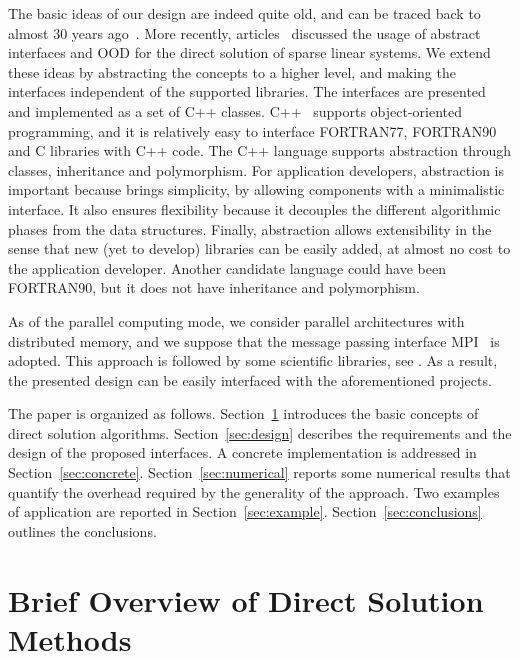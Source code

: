 \documentclass[acmtocl]{acmtrans2m}
\begin{document}
The basic ideas of our design are indeed quite old, and can be traced back to
almost 30 years ago~\cite{duff79performance,george79design}. More recently,
  articles~\cite{george99object,dobrian99design} discussed the usage of
  abstract interfaces and OOD for the direct solution of sparse linear
  systems.  We extend these ideas by abstracting the concepts to
a higher level, and making the interfaces independent of the supported
libraries. The interfaces are presented and implemented as a
set of C++ classes.  C++~\cite{cppbook}
supports object-oriented programming, and it is relatively easy to interface
FORTRAN77, FORTRAN90 and C libraries with C++ code. The C++ language
supports abstraction through classes, inheritance and polymorphism. For
application developers, abstraction is important because brings simplicity,
by allowing components with a minimalistic interface. It also ensures flexibility
because it decouples the different algorithmic phases from the data structures.
Finally, abstraction allows extensibility in the sense that new (yet to
                                                                develop)
libraries can be easily added, at almost no cost to the application developer.
Another candidate language could have been FORTRAN90, but it does not have
inheritance and polymorphism.

%
%
As of the parallel computing mode, 
we consider parallel architectures with distributed memory, and we suppose
that the message passing interface MPI~\cite{gropp98mpi} is adopted.
This approach is followed by some scientific libraries, see
\cite{heroux05trilinos,petsc-user-ref,falgout02hypre}. As a result, the presented
design can be easily interfaced with the aforementioned projects.

\smallskip

The paper is organized as follows. Section~\ref{sec:overview} introduces the
basic concepts of direct solution algorithms. Section~\ref{sec:design}
describes the requirements and the design of the proposed
interfaces. A concrete implementation is addressed in
Section~\ref{sec:concrete}. Section~\ref{sec:numerical} reports some
numerical results that quantify the overhead required by the generality of
the approach. Two
examples of application are reported in Section~\ref{sec:example}.
Section~\ref{sec:conclusions} outlines the conclusions.

\section{Brief Overview of Direct Solution Methods}
\label{sec:overview}
\end{document}
